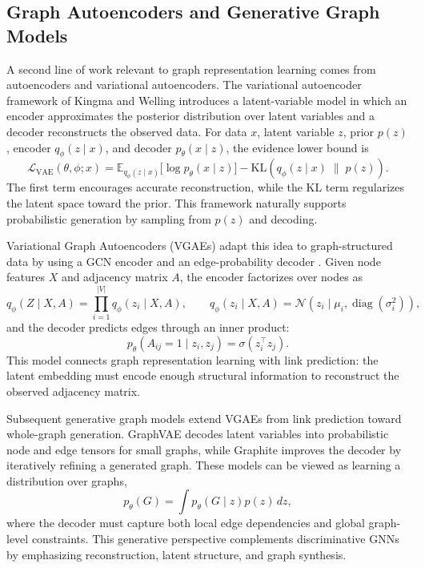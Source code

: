 \documentclass[11pt]{article}
\begin{document}
\subsection{Graph Autoencoders and Generative Graph Models}
A second line of work relevant to graph representation learning comes from autoencoders and variational autoencoders. The variational autoencoder framework of Kingma and Welling \cite{kingma2014autoencoding} introduces a latent-variable model in which an encoder approximates the posterior distribution over latent variables and a decoder reconstructs the observed data. For data $x$, latent variable $z$, prior $p(z)$, encoder $q_\phi(z\mid x)$, and decoder $p_\theta(x\mid z)$, the evidence lower bound is
\[
    \mathcal{L}_{\mathrm{VAE}}(\theta,\phi;x)
    = \mathbb{E}_{q_\phi(z\mid x)}\big[\log p_\theta(x\mid z)\big]
      - \mathrm{KL}\!\left(q_\phi(z\mid x)\;\|\;p(z)\right).
\]
The first term encourages accurate reconstruction, while the KL term regularizes the latent space toward the prior. This framework naturally supports probabilistic generation by sampling from $p(z)$ and decoding.

Variational Graph Autoencoders (VGAEs) adapt this idea to graph-structured data by using a GCN encoder and an edge-probability decoder \cite{kipf2016variational}. Given node features $X$ and adjacency matrix $A$, the encoder factorizes over nodes as
\[
    q_\phi(Z\mid X,A)
    = \prod_{i=1}^{|V|} q_\phi(z_i\mid X,A),
    \qquad
    q_\phi(z_i\mid X,A)
    = \mathcal{N}\!\left(z_i\mid \mu_i,\operatorname{diag}(\sigma_i^2)\right),
\]
and the decoder predicts edges through an inner product:
\[
    p_\theta(A_{ij}=1\mid z_i,z_j)
    = \sigma(z_i^\top z_j).
\]
This model connects graph representation learning with link prediction: the latent embedding must encode enough structural information to reconstruct the observed adjacency matrix.

Subsequent generative graph models extend VGAEs from link prediction toward whole-graph generation. GraphVAE \cite{simonovsky2018graphvae} decodes latent variables into probabilistic node and edge tensors for small graphs, while Graphite \cite{grover2019graphite} improves the decoder by iteratively refining a generated graph. These models can be viewed as learning a distribution over graphs,
\[
    p_\theta(G)
    = \int p_\theta(G\mid z)p(z)\,dz,
\]
where the decoder must capture both local edge dependencies and global graph-level constraints. This generative perspective complements discriminative GNNs by emphasizing reconstruction, latent structure, and graph synthesis.
\end{document}
